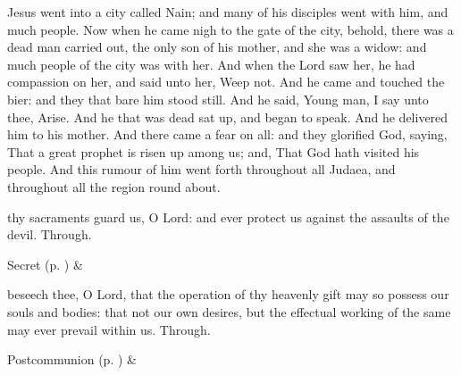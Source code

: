 
 Jesus went into a city called Nain; and many of his disciples went with him, and much people. Now when he came nigh to the gate of the city, behold, there was a dead man carried out, the only son of his mother, and she was a widow: and much people of the city was with her. And when the Lord saw her, he had compassion on her, and said unto her, Weep not. And he came and touched the bier: and they that bare him stood still. And he said, Young man, I say unto thee, Arise. And he that was dead sat up, and began to speak. And he delivered him to his mother. And there came a fear on all: and they glorified God, saying, That a great prophet is risen up among us; and, That God hath visited his people. And this rumour of him went forth throughout all Judaea, and throughout all the region round about.


\secret
{} thy sacraments guard us, O Lord: and ever protect us against the assaults of the devil. Through.


\begin{rubric}
     Secret  (p. \pageref{SPSaints}) \&  
\end{rubric}


\postcommunion
{} beseech thee, O Lord, that the operation of thy heavenly gift may so possess our souls and bodies: that not our own desires, but the effectual working of the same may ever prevail within us. Through.
\begin{rubric}
     Postcommunion  (p. \pageref{SPSaints}) \&  
\end{rubric}


\clearpage
